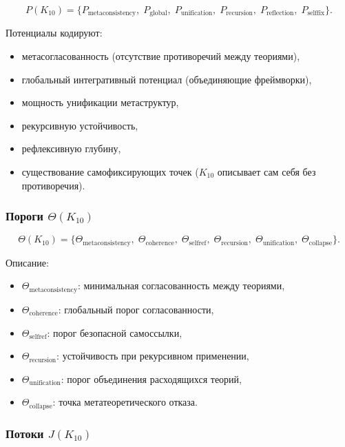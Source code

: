 \[
P(K_{10})=
\{
P_{\mathrm{metaconsistency}},\;
P_{\mathrm{global}},\;
P_{\mathrm{unification}},\;
P_{\mathrm{recursion}},\;
P_{\mathrm{reflection}},\;
P_{\mathrm{selffix}}
\}.
\]

Потенциалы кодируют:
\begin{itemize}
    \item метасогласованность (отсутствие противоречий между теориями),
    \item глобальный интегративный потенциал (объединяющие фреймворки),
    \item мощность унификации метаструктур,
    \item рекурсивную устойчивость,
    \item рефлексивную глубину,
    \item существование самофиксирующих точек ($K_{10}$ описывает сам себя без противоречия).
\end{itemize}

\subsubsection{Пороги $\Theta(K_{10})$}

\[
\Theta(K_{10})=
\{
\Theta_{\mathrm{metaconsistency}},\;
\Theta_{\mathrm{coherence}},\;
\Theta_{\mathrm{selfref}},\;
\Theta_{\mathrm{recursion}},\;
\Theta_{\mathrm{unification}},\;
\Theta_{\mathrm{collapse}}
\}.
\]

Описание:
\begin{itemize}
    \item $\Theta_{\mathrm{metaconsistency}}$: минимальная согласованность между теориями,
    \item $\Theta_{\mathrm{coherence}}$: глобальный порог согласованности,
    \item $\Theta_{\mathrm{selfref}}$: порог безопасной самоссылки,
    \item $\Theta_{\mathrm{recursion}}$: устойчивость при рекурсивном применении,
    \item $\Theta_{\mathrm{unification}}$: порог объединения расходящихся теорий,
    \item $\Theta_{\mathrm{collapse}}$: точка метатеоретического отказа.
\end{itemize}

\subsubsection{Потоки $J(K_{10})$}


